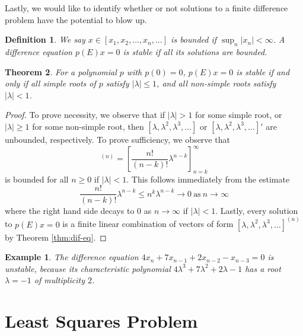 \documentclass[12pt,reqno]{amsart}
\numberwithin{equation}{section}  %
\newtheorem{theorem}{Theorem}[section]
\newtheorem{definition}[theorem]{Definition}
\newtheorem{example}{Example}[section]
\begin{document}
Lastly, we would like to identify whether or not solutions  to a finite
difference problem have the potential to blow up.
\begin{definition}
We say $x \in [x_1, x_2, \ldots, x_n, \ldots]$ is \emph{bounded}
if $\sup_n | x_n | < \infty$. A difference equation $p(E)x = 0$ is 
\emph{stable} if all its solutions are bounded.
\end{definition}
\begin{theorem}
For a polynomial $p$ with $p(0) = 0$, $p(E)x = 0$ is stable if and only if
all simple roots of $p$ satisfy $|\lambda| \le 1$, and all non-simple roots
satisfy $|\lambda| < 1$. 
\end{theorem}
\begin{proof}
To prove necessity, we observe that if $|\lambda| > 1$ for some simple root, or
$|\lambda| \ge 1$ for some non-simple root, then $[\lambda, \lambda^2, \lambda^3,
\ldots]$ or $[\lambda, \lambda^2, \lambda^3, \ldots]'$ are unbounded, respectively.
To prove sufficiency, we observe that
\begin{equation*}
[\lambda, \lambda^2, \lambda^3,
\ldots]^{(n)} = \left [ \frac{n!}{(n - k)!} \lambda^{n - k} \right ]_{n =
k}^{\infty} 
\end{equation*}
is bounded for all $n \ge 0$ if $|\lambda| < 1$. This follows immediately from
the estimate 
\begin{equation*}
\frac{n!}{(n - k)!} \lambda^{n - k}  \le n^{k} \lambda^{n-k} \to 0 \ \text{as} \
n \to \infty
\end{equation*}
where the right hand side decays to $0$ as $n \to \infty$ if $|\lambda| < 1$. Lastly,
every  solution to $p(E)x = 0$ is a finite linear combination of vectors of form
$[\lambda, \lambda^2, \lambda^3, \ldots]^{(n)}$ by Theorem \ref{thm:dif-eq}.
\end{proof}
\begin{example}
The difference equation $4x_n + 7x_{n-1} + 2 x_{n-2} - x_{n-3} = 0$ is
unstable, because its characteristic polynomial 
$4\lambda^{3} + 7\lambda^{2} + 2 \lambda - 1$ has a root $\lambda= -1$  
of multiplicity $2$.
\end{example}
\section{Least Squares Problem}
\end{document}

